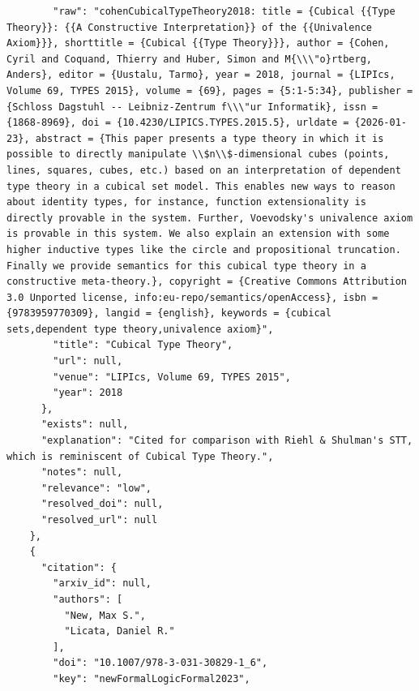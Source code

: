 \documentclass[11pt]{article}
\begin{document}
\begin{verbatim}
        "raw": "cohenCubicalTypeTheory2018: title = {Cubical {{Type Theory}}: {{A Constructive Interpretation}} of the {{Univalence Axiom}}}, shorttitle = {Cubical {{Type Theory}}}, author = {Cohen, Cyril and Coquand, Thierry and Huber, Simon and M{\\\"o}rtberg, Anders}, editor = {Uustalu, Tarmo}, year = 2018, journal = {LIPIcs, Volume 69, TYPES 2015}, volume = {69}, pages = {5:1-5:34}, publisher = {Schloss Dagstuhl -- Leibniz-Zentrum f\\\"ur Informatik}, issn = {1868-8969}, doi = {10.4230/LIPICS.TYPES.2015.5}, urldate = {2026-01-23}, abstract = {This paper presents a type theory in which it is possible to directly manipulate \\$n\\$-dimensional cubes (points, lines, squares, cubes, etc.) based on an interpretation of dependent type theory in a cubical set model. This enables new ways to reason about identity types, for instance, function extensionality is directly provable in the system. Further, Voevodsky's univalence axiom is provable in this system. We also explain an extension with some higher inductive types like the circle and propositional truncation. Finally we provide semantics for this cubical type theory in a constructive meta-theory.}, copyright = {Creative Commons Attribution 3.0 Unported license, info:eu-repo/semantics/openAccess}, isbn = {9783959770309}, langid = {english}, keywords = {cubical sets,dependent type theory,univalence axiom}",
        "title": "Cubical Type Theory",
        "url": null,
        "venue": "LIPIcs, Volume 69, TYPES 2015",
        "year": 2018
      },
      "exists": null,
      "explanation": "Cited for comparison with Riehl & Shulman's STT, which is reminiscent of Cubical Type Theory.",
      "notes": null,
      "relevance": "low",
      "resolved_doi": null,
      "resolved_url": null
    },
    {
      "citation": {
        "arxiv_id": null,
        "authors": [
          "New, Max S.",
          "Licata, Daniel R."
        ],
        "doi": "10.1007/978-3-031-30829-1_6",
        "key": "newFormalLogicFormal2023",

\end{verbatim}
\end{document}
